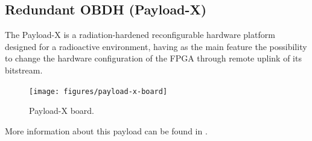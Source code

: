\subsection{Redundant OBDH (Payload-X)}

The Payload-X is a radiation-hardened reconfigurable hardware platform designed for a radioactive environment, having as the main feature the possibility to change the hardware configuration of the FPGA through remote uplink of its bitstream.

\begin{figure}[!ht]
    \begin{center}
        \texttt{[image: figures/payload-x-board]}
        \caption{Payload-X board.}
        \label{fig:payload-x-board}
    \end{center}
\end{figure}

More information about this payload can be found in \cite{rigo2019}.




